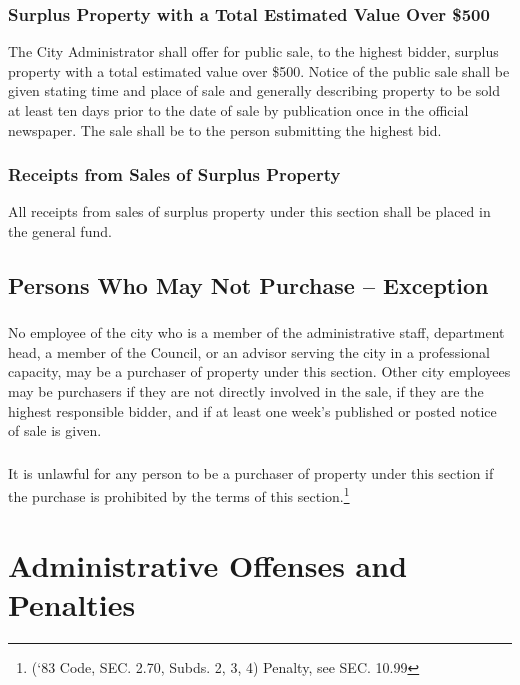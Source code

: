 \subsubsection{Surplus Property with a Total Estimated Value Over \$500}
The City Administrator shall offer for public sale, to the highest bidder, surplus property with a total estimated value over \$500.  Notice of the public sale shall be given stating time and place of sale and generally describing property to be sold at least ten days prior to the date of sale by publication once in the official newspaper.  The sale shall be to the person submitting the highest bid.
\subsubsection{Receipts from Sales of Surplus Property}
All receipts from sales of surplus property under this section shall be placed in the general fund.
\subsection{Persons Who May Not Purchase -- Exception}
\subsubsection{}
No employee of the city who is a member of the administrative staff, department head, a member of the Council, or an advisor serving the city in a professional capacity, may be a purchaser of property under this section.  Other city employees may be purchasers if they are not directly involved in the sale, if they are the highest responsible bidder, and if at least one week’s published or posted notice of sale is given.
\subsubsection{}
It is unlawful for any person to be a purchaser of property under this section if the purchase is prohibited by the terms of this section.\footnote{(‘83 Code, SEC. 2.70, Subds. 2, 3, 4) Penalty, see SEC. 10.99}

\section{Administrative Offenses and Penalties}
